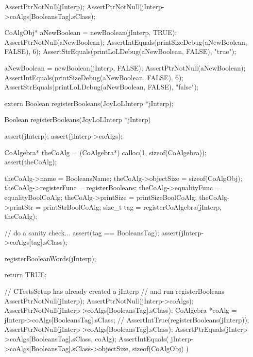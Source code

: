 
\startCTest
  AssertPtrNotNull(jInterp);
  AssertPtrNotNull(jInterp->coAlgs[BooleansTag].sClass);

  CoAlgObj* aNewBoolean = newBoolean(jInterp, TRUE);
  AssertPtrNotNull(aNewBoolean);
  AssertIntEquals(printSizeDebug(aNewBoolean, FALSE), 6);
  AssertStrEquals(printLoLDebug(aNewBoolean, FALSE), "true");

  aNewBoolean = newBoolean(jInterp, FALSE);
  AssertPtrNotNull(aNewBoolean);
  AssertIntEquals(printSizeDebug(aNewBoolean, FALSE), 6);
  AssertStrEquals(printLoLDebug(aNewBoolean, FALSE), "false");
\stopCTest
\stopTestCase
\stopTestSuite

\startTestSuite[registerBooleans]

\startCHeader
extern Boolean registerBooleans(JoyLoLInterp *jInterp);
\stopCHeader

\startCCode
Boolean registerBooleans(JoyLoLInterp *jInterp) {
  assert(jInterp);
  assert(jInterp->coAlgs);
  
  CoAlgebra* theCoAlg    = (CoAlgebra*) calloc(1, sizeof(CoAlgebra));
  assert(theCoAlg);
  
  theCoAlg->name         = BooleansName;
  theCoAlg->objectSize   = sizeof(CoAlgObj);
  theCoAlg->registerFunc = registerBooleans;
  theCoAlg->equalityFunc = equalityBoolCoAlg;
  theCoAlg->printSize    = printSizeBoolCoAlg;
  theCoAlg->printStr     = printStrBoolCoAlg;
  size_t tag = registerCoAlgebra(jInterp, theCoAlg);
  
  // do a sanity check...
  assert(tag == BooleansTag);
  assert(jInterp->coAlgs[tag].sClass);
  
  registerBooleanWords(jInterp);
  
  return TRUE;
}
\stopCCode


\startCTest
  // CTestsSetup has already created a jInterp
  // and run registerBooleans
  AssertPtrNotNull(jInterp);
  AssertPtrNotNull(jInterp->coAlgs);
  AssertPtrNotNull(jInterp->coAlgs[BooleansTag].sClass);
  CoAlgebra *coAlg = jInterp->coAlgs[BooleansTag].sClass;
//  AssertIntTrue(registerBooleans(jInterp));
  AssertPtrNotNull(jInterp->coAlgs[BooleansTag].sClass);
  AssertPtrEquals(jInterp->coAlgs[BooleansTag].sClass, coAlg);
  AssertIntEquals(
    jInterp->coAlgs[BooleansTag].sClass->objectSize,
    sizeof(CoAlgObj)
  )
\stopCTest
\stopTestCase
\stopTestSuite


